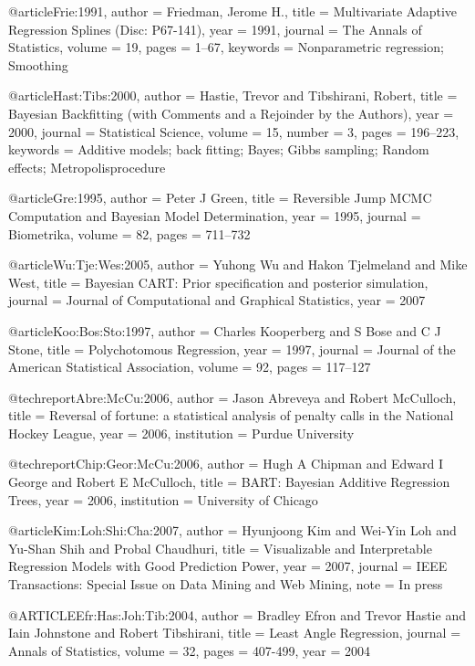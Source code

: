 @article{Frie:1991,
    author = {Friedman, Jerome H.},
    title = {Multivariate Adaptive Regression Splines ({D}isc: P67-141)},
    year = {1991},
    journal = {The Annals of Statistics},
    volume = {19},
    pages = {1--67},
    keywords = {Nonparametric regression; Smoothing}
}

@article{Hast:Tibs:2000,
    author = {Hastie, Trevor and Tibshirani, Robert},
    title = {Bayesian Backfitting (with Comments and a Rejoinder by the Authors)},
    year = {2000},
    journal = {Statistical Science},
    volume = {15},
    number = {3},
    pages = {196--223},
    keywords = {Additive models; back fitting; Bayes; Gibbs sampling;
Random effects; Metropolis\textndashHastings procedure}
}

@article{Gre:1995,
    author = {Peter J Green},
    title = {Reversible Jump {MCMC} Computation and {B}ayesian Model Determination},
    year = {1995},
    journal = {Biometrika},
    volume = {82},
    pages = {711--732}
}

@article{Wu:Tje:Wes:2005,
    author = {Yuhong Wu and Hakon Tjelmeland and Mike West},
    title = {{B}ayesian {CART}: Prior specification and posterior
simulation},
    journal = {Journal of Computational and Graphical Statistics},
    year = 2007
}

@article{Koo:Bos:Sto:1997,
    author = {Charles Kooperberg and S Bose and C J Stone},
    title = {Polychotomous Regression},
    year = {1997},
    journal = {Journal of the American Statistical Association},
    volume = {92},
    pages = {117--127}
}


@techreport{Abre:McCu:2006,
    author = {Jason Abreveya and Robert McCulloch},
    title = {Reversal of fortune: a statistical analysis of penalty calls
in the National Hockey League},
    year = {2006},
    institution = {Purdue University}
}

@techreport{Chip:Geor:McCu:2006,
    author = {Hugh A Chipman and Edward I George and Robert E McCulloch},
    title = {{BART}: Bayesian Additive Regression Trees},
    year = {2006},
    institution = {University of Chicago}
}


@article{Kim:Loh:Shi:Cha:2007,
    author = {Hyunjoong Kim and Wei-Yin Loh and Yu-Shan Shih and Probal
Chaudhuri},
    title = {Visualizable and Interpretable Regression Models with Good
Prediction Power},
    year = {2007},
    journal = {IEEE Transactions: Special Issue on Data Mining and Web
Mining},
    note = {In press}
}

@ARTICLE{Efr:Has:Joh:Tib:2004,
  author = {Bradley Efron and Trevor Hastie and Iain Johnstone and Robert
Tibshirani},
  title = {Least Angle Regression},
  journal = {Annals of Statistics},
  volume = {32},
  pages = {407-499},
  year = {2004}
}

